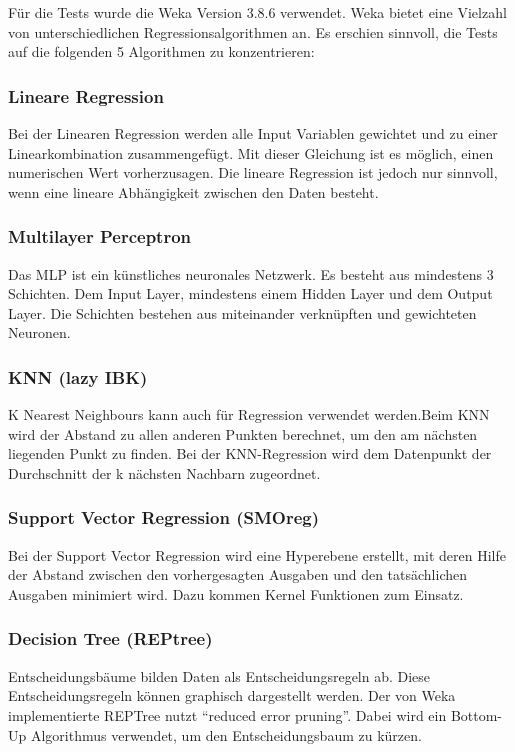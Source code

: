 \documentclass[letterpaper]{article} %
\begin{document}
    Für die Tests wurde die Weka Version 3.8.6 verwendet.
    Weka bietet eine Vielzahl von unterschiedlichen Regressionsalgorithmen an. Es erschien sinnvoll, die Tests auf die folgenden 5 Algorithmen zu konzentrieren:
    
    \subsubsection*{Lineare Regression}
        Bei der Linearen Regression werden alle Input Variablen gewichtet und zu einer Linearkombination zusammengefügt. Mit dieser Gleichung ist es möglich, einen numerischen Wert vorherzusagen. Die lineare Regression ist jedoch nur sinnvoll, wenn eine lineare Abhängigkeit zwischen den Daten besteht.
    
    \subsubsection*{Multilayer Perceptron}
        Das MLP ist ein künstliches neuronales Netzwerk. Es besteht aus mindestens 3 Schichten. Dem Input Layer, mindestens einem Hidden Layer und dem Output Layer. Die Schichten bestehen aus miteinander verknüpften und gewichteten Neuronen. 
    
    \subsubsection*{KNN (lazy IBK)}
        K Nearest Neighbours kann auch für Regression verwendet werden.Beim KNN wird der Abstand zu allen anderen Punkten berechnet, um den am nächsten liegenden Punkt zu finden. Bei der KNN-Regression wird dem Datenpunkt der Durchschnitt der k nächsten Nachbarn zugeordnet.
    
    \subsubsection*{Support Vector Regression (SMOreg)}
        Bei der Support Vector Regression wird eine Hyperebene erstellt, mit deren Hilfe der Abstand zwischen den vorhergesagten Ausgaben und den tatsächlichen Ausgaben minimiert wird. Dazu kommen Kernel Funktionen zum Einsatz.
    
    \subsubsection*{Decision Tree (REPtree)}
        Entscheidungsbäume bilden Daten als Entscheidungsregeln ab. Diese Entscheidungsregeln können graphisch dargestellt werden. Der von Weka implementierte REPTree nutzt “reduced error pruning”. Dabei wird ein Bottom-Up Algorithmus verwendet, um den Entscheidungsbaum zu kürzen.
    
\end{document}
